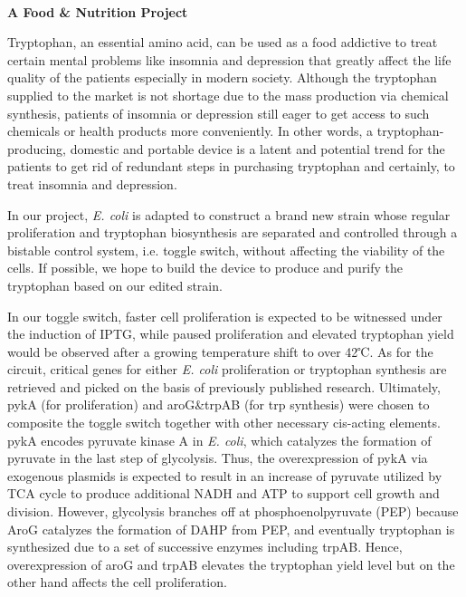 \textbf{\\A Food & Nutrition Project\\}\begin{spacing}{1.5}

Tryptophan, an essential amino acid, can be used as a food addictive to treat certain mental problems like insomnia and depression that greatly affect the life quality of the patients especially in modern society. Although the tryptophan supplied to the market is not shortage due to the mass production via chemical synthesis, patients of insomnia or depression still eager to get access to such chemicals or health products more conveniently. In other words, a tryptophan-producing, domestic and portable device is a latent and potential trend for the patients to get rid of redundant steps in purchasing tryptophan and certainly, to treat insomnia and depression.

In our project, \textit{E. coli} is adapted to construct a brand new strain whose regular proliferation and tryptophan biosynthesis are separated and controlled through a bistable control system, i.e. toggle switch, without affecting the viability of the cells. If possible, we hope to build the device to produce and purify the tryptophan based on our edited strain.

In our toggle switch, faster cell proliferation is expected to be witnessed under the induction of IPTG, while paused proliferation and elevated tryptophan yield would be observed after a growing temperature shift to over 42℃. As for the circuit, critical genes for either \textit{E. coli} proliferation or tryptophan synthesis are retrieved and picked on the basis of previously published research. Ultimately, pykA (for proliferation) and aroG&trpAB (for trp synthesis) were chosen to composite the toggle switch together with other necessary cis-acting elements. pykA encodes pyruvate kinase A in \textit{E. coli}, which catalyzes the formation of pyruvate in the last step of glycolysis. Thus, the overexpression of pykA via exogenous plasmids is expected to result in an increase of pyruvate utilized by TCA cycle to produce additional NADH and ATP to support cell growth and division. However, glycolysis branches off at phosphoenolpyruvate (PEP) because AroG catalyzes the formation of DAHP from PEP, and eventually tryptophan is synthesized due to a set of successive enzymes including trpAB. Hence, overexpression of aroG and trpAB elevates the tryptophan yield level but on the other hand affects the cell proliferation.\end{spacing}
\\


